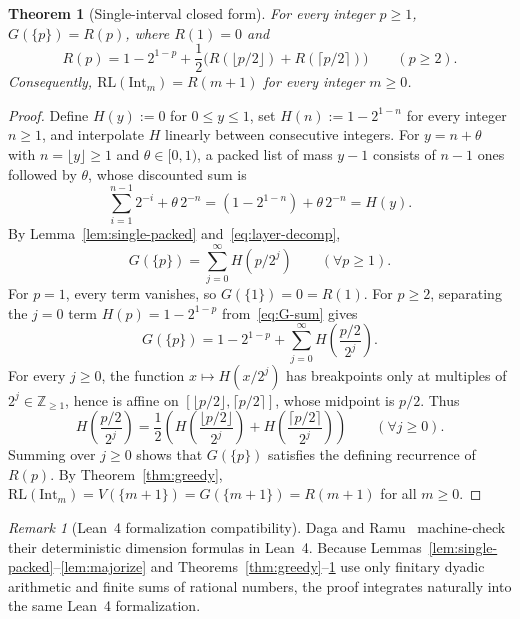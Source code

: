 \documentclass[11pt]{article}
\theoremstyle{plain}
\newtheorem{theorem}{Theorem}
\theoremstyle{definition}
\theoremstyle{remark}
\newtheorem{remark}{Remark}
\newcommand{\RL}{\mathrm{RL}}
\newcommand{\Int}{\mathrm{Int}}
\begin{document}
\begin{theorem}[Single-interval closed form]\label{thm:single}
For every integer $p \ge 1$, $G(\{p\}) = R(p)$, where $R(1) = 0$ and
\[
R(p) = 1 - 2^{1 - p} + \frac{1}{2}\bigl(R(\lfloor p/2 \rfloor) + R(\lceil p/2 \rceil)\bigr) \qquad (p \ge 2).
\]
Consequently, $\RL(\Int_m) = R(m + 1)$ for every integer $m \ge 0$.
\end{theorem}

\begin{proof}
Define $H(y) := 0$ for $0 \le y \le 1$, set $H(n) := 1 - 2^{1 - n}$ for every integer $n \ge 1$, and interpolate $H$ linearly between consecutive integers.
For $y = n + \theta$ with $n = \lfloor y \rfloor \ge 1$ and $\theta \in [0, 1)$, a packed list of mass $y - 1$ consists of $n - 1$ ones followed by $\theta$, whose discounted sum is
\[
\sum_{i = 1}^{n - 1} 2^{-i} + \theta\,2^{-n} = (1 - 2^{1 - n}) + \theta\,2^{-n} = H(y).
\]
By Lemma~\ref{lem:single-packed} and~\eqref{eq:layer-decomp},
\begin{equation}\label{eq:G-sum}
G(\{p\}) = \sum_{j = 0}^\infty H(p / 2^j) \qquad (\forall p \ge 1).
\end{equation}
For $p = 1$, every term vanishes, so $G(\{1\}) = 0 = R(1)$. For $p \ge 2$, separating the $j = 0$ term $H(p) = 1 - 2^{1 - p}$ from~\eqref{eq:G-sum} gives
\[
G(\{p\}) = 1 - 2^{1 - p} + \sum_{j = 0}^\infty H\!\left(\frac{p/2}{2^j}\right).
\]
For every $j \ge 0$, the function $x \mapsto H(x / 2^j)$ has breakpoints only at multiples of $2^j \in \mathbb{Z}_{\ge 1}$, hence is affine on $[\lfloor p/2 \rfloor, \lceil p/2 \rceil]$, whose midpoint is $p/2$. Thus
\[
H\!\left(\frac{p/2}{2^j}\right) = \frac{1}{2}\left(H\!\left(\frac{\lfloor p/2 \rfloor}{2^j}\right) + H\!\left(\frac{\lceil p/2 \rceil}{2^j}\right)\right) \qquad (\forall j \ge 0).
\]
Summing over $j \ge 0$ shows that $G(\{p\})$ satisfies the defining recurrence of $R(p)$. By Theorem~\ref{thm:greedy}, $\RL(\Int_m) = V(\{m + 1\}) = G(\{m + 1\}) = R(m + 1)$ for all $m \ge 0$.
\end{proof}

\begin{remark}[Lean~4 formalization compatibility]
Daga and Ramu~\cite{DagaRamu2026} machine-check their deterministic dimension formulas in Lean~4. Because Lemmas~\ref{lem:single-packed}--\ref{lem:majorize} and Theorems~\ref{thm:greedy}--\ref{thm:single} use only finitary dyadic arithmetic and finite sums of rational numbers, the proof integrates naturally into the same Lean~4 formalization.
\end{remark}
\end{document}
